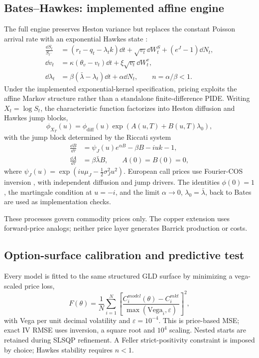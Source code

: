 \subsection{Bates--Hawkes: implemented affine engine}
The full engine preserves Heston variance but replaces the constant Poisson arrival rate with an exponential Hawkes state \citep{hawkes1971}:
\begin{align}
\frac{\dd S_t}{S_{t^-}}&=(r_t-q_t-\lambda_t k)\dd t+\sqrt{v_t}\dd W_t^S+(e^J-1)\dd N_t,\\
\dd v_t&=\kappa(\theta_v-v_t)\dd t+\xi\sqrt{v_t}\dd W_t^v,\\
\dd\lambda_t&=\beta(\bar\lambda-\lambda_t)\dd t+\alpha\dd N_t,
\qquad n=\alpha/\beta<1.
\label{eq:full_bh_sde}
\end{align}
Under the implemented exponential-kernel specification, pricing exploits the affine Markov structure rather than a standalone finite-difference PIDE. Writing $X_t=\log S_t$, the characteristic function factorizes into Heston diffusion and Hawkes jump blocks,
\begin{equation}
\phi_{X_T}(u)=\phi_{\mathrm{diff}}(u)\exp\!\left(A(u,T)+B(u,T)\lambda_0\right),
\label{eq:bh_cf}
\end{equation}
with the jump block determined by the Riccati system
\begin{align}
\frac{\dd B}{\dd\tau}&=\psi_J(u)e^{\alpha B}-\beta B-iuk-1,\\
\frac{\dd A}{\dd\tau}&=\beta\bar\lambda B,
\qquad A(0)=B(0)=0,
\label{eq:bh_riccati}
\end{align}
where $\psi_J(u)=\exp(iu\mu_J-\tfrac12\sigma_J^2u^2)$. European call prices use Fourier-COS inversion \citep{cos2008}, with independent diffusion and jump drivers. The identities $\phi(0)=1$, the martingale condition at $u=-i$, and the limit $\alpha\to0$, $\lambda_0=\bar\lambda$, back to Bates are used as implementation checks.

\begin{methodbox}
These processes govern commodity prices only. The copper extension uses forward-price analogs; neither price layer generates Barrick production or costs.
\end{methodbox}

\subsection{Option-surface calibration and predictive test}
Every model is fitted to the same structured GLD surface by minimizing a vega-scaled price loss,
\begin{equation}
F(\theta)=\frac{1}{N}\sum_{i=1}^{N}
\left[\frac{C_i^{model}(\theta)-C_i^{mkt}}
{\max(\mathrm{Vega}_i,\varepsilon)}\right]^2,
\label{eq:calibration_loss}
\end{equation}
with Vega per unit decimal volatility and $\varepsilon=10^{-4}$. This is price-based MSE; exact IV RMSE uses inversion, a square root and $10^4$ scaling. Nested starts are retained during SLSQP refinement. A Feller strict-positivity constraint is imposed by choice; Hawkes stability requires $n<1$.

